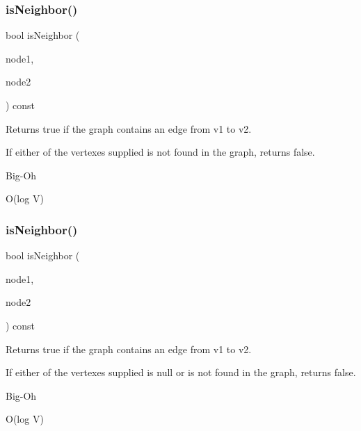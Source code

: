 \subsubsection{\texorpdfstring{is\+Neighbor()}{isNeighbor()}\hspace{0.1cm}{\footnotesize\ttfamily [1/2]}}
{\footnotesize\ttfamily bool is\+Neighbor (\begin{DoxyParamCaption}\item[{const std\+::string \&}]{node1,  }\item[{const std\+::string \&}]{node2 }\end{DoxyParamCaption}) const\hspace{0.3cm}{\ttfamily [inherited]}}



Returns true if the graph contains an edge from v1 to v2. 

If either of the vertexes supplied is not found in the graph, returns false. \begin{DoxyRefDesc}{Big-\/\+Oh}
\item[\mbox{\hyperlink{BigOh__BigOh000080}{Big-\/\+Oh}}]O(log V) \end{DoxyRefDesc}
\mbox{\label{classGraph_a9e752628a118c4a06a538067c95bbb28}} 
\subsubsection{\texorpdfstring{is\+Neighbor()}{isNeighbor()}\hspace{0.1cm}{\footnotesize\ttfamily [2/2]}}
{\footnotesize\ttfamily bool is\+Neighbor (\begin{DoxyParamCaption}\item[{\mbox{\hyperlink{classVertexGen}{Vertex\+Gen}}$<$ V, E $>$  $\ast$}]{node1,  }\item[{\mbox{\hyperlink{classVertexGen}{Vertex\+Gen}}$<$ V, E $>$  $\ast$}]{node2 }\end{DoxyParamCaption}) const\hspace{0.3cm}{\ttfamily [inherited]}}



Returns true if the graph contains an edge from v1 to v2. 

If either of the vertexes supplied is null or is not found in the graph, returns false. \begin{DoxyRefDesc}{Big-\/\+Oh}
\item[\mbox{\hyperlink{BigOh__BigOh000081}{Big-\/\+Oh}}]O(log V) \end{DoxyRefDesc}
\mbox{\label{classGraph_a5dd1afdb4e1c75fbe51976bf6f70c922}} 
